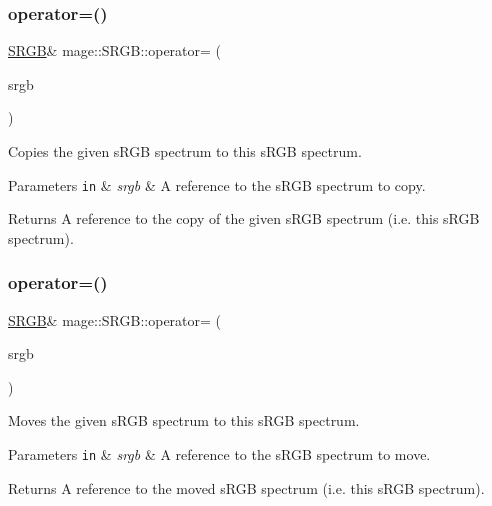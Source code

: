 \subsubsection{\texorpdfstring{operator=()}{operator=()}\hspace{0.1cm}{\footnotesize\ttfamily [1/2]}}
{\footnotesize\ttfamily \hyperlink{structmage_1_1_s_r_g_b}{S\+R\+GB}\& mage\+::\+S\+R\+G\+B\+::operator= (\begin{DoxyParamCaption}\item[{const \hyperlink{structmage_1_1_s_r_g_b}{S\+R\+GB} \&}]{srgb }\end{DoxyParamCaption})\hspace{0.3cm}{\ttfamily [default]}}

Copies the given s\+R\+GB spectrum to this s\+R\+GB spectrum.


\begin{DoxyParams}[1]{Parameters}
\mbox{\tt in}  & {\em srgb} & A reference to the s\+R\+GB spectrum to copy. \\
\hline
\end{DoxyParams}
\begin{DoxyReturn}{Returns}
A reference to the copy of the given s\+R\+GB spectrum (i.\+e. this s\+R\+GB spectrum). 
\end{DoxyReturn}
\hypertarget{structmage_1_1_s_r_g_b_a8e341bbabae9b0e09c27f3e3fc418950}{}\label{structmage_1_1_s_r_g_b_a8e341bbabae9b0e09c27f3e3fc418950} 
\subsubsection{\texorpdfstring{operator=()}{operator=()}\hspace{0.1cm}{\footnotesize\ttfamily [2/2]}}
{\footnotesize\ttfamily \hyperlink{structmage_1_1_s_r_g_b}{S\+R\+GB}\& mage\+::\+S\+R\+G\+B\+::operator= (\begin{DoxyParamCaption}\item[{\hyperlink{structmage_1_1_s_r_g_b}{S\+R\+GB} \&\&}]{srgb }\end{DoxyParamCaption})\hspace{0.3cm}{\ttfamily [default]}}

Moves the given s\+R\+GB spectrum to this s\+R\+GB spectrum.


\begin{DoxyParams}[1]{Parameters}
\mbox{\tt in}  & {\em srgb} & A reference to the s\+R\+GB spectrum to move. \\
\hline
\end{DoxyParams}
\begin{DoxyReturn}{Returns}
A reference to the moved s\+R\+GB spectrum (i.\+e. this s\+R\+GB spectrum). 
\end{DoxyReturn}
